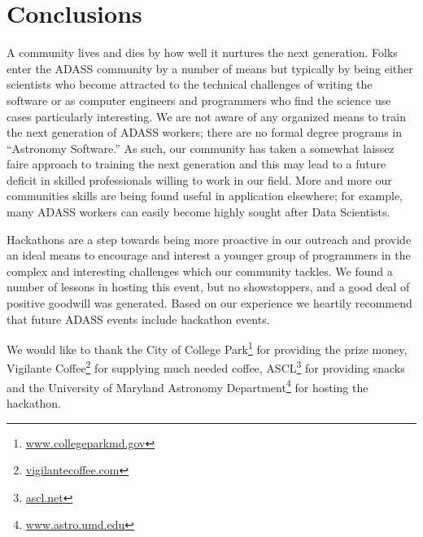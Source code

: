 \documentclass[11pt,twoside]{article}
\begin{document}
\section*{Conclusions}

A community lives and dies by how well it nurtures the next generation. Folks enter the ADASS community by a number of means but typically by being either scientists who become attracted to the technical challenges of writing the software or as computer engineers and programmers who find the science use cases particularly interesting. We are not aware of any organized means to train the next generation of ADASS workers; there are no formal degree programs in “Astronomy Software.” As such, our community has taken a somewhat laissez faire approach to training the next generation and this may lead to a future deficit in skilled professionals willing to work in our field.  More and more our communities skills are being found useful in application elsewhere; for example, many ADASS workers can easily become highly sought after Data Scientists.

Hackathons are a step towards being more proactive in our outreach and provide an ideal means to encourage and interest a younger group of programmers in the complex and interesting challenges which our community tackles. We found a number of lessons in hosting this event, but no showstoppers, and a good deal of positive goodwill was generated. Based on our experience we heartily recommend that future ADASS events include hackathon events.

\acknowledgements We would like to thank the City of College Park\footnote{\url{www.collegeparkmd.gov}} for providing the prize money, Vigilante Coffee\footnote{\url{vigilantecoffee.com}} for supplying much needed coffee, ASCL\footnote{\url{ascl.net}} for providing snacks and the University of Maryland Astronomy Department\footnote{\url{www.astro.umd.edu}} for hosting the hackathon.




%
\end{document}
